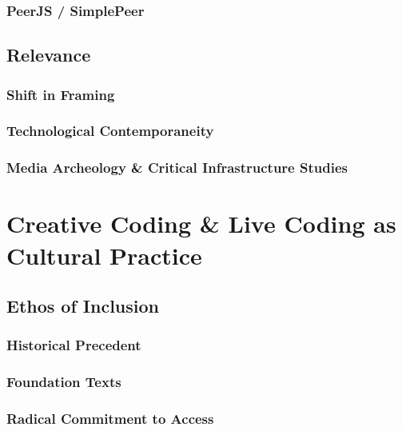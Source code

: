 \documentclass[
  american,
  12pt,
]{article}
\begin{document}
\subsubsection{PeerJS / SimplePeer}\label{peerjs-simplepeer}

\subsection{Relevance}\label{relevance}

\subsubsection{Shift in Framing}\label{shift-in-framing}

\subsubsection{Technological
Contemporaneity}\label{technological-contemporaneity}

\subsubsection{Media Archeology \& Critical Infrastructure
Studies}\label{media-archeology-critical-infrastructure-studies}

\section{Creative Coding \& Live Coding as Cultural
Practice}\label{creative-coding-live-coding-as-cultural-practice}

\subsection{Ethos of Inclusion}\label{ethos-of-inclusion}

\subsubsection{Historical Precedent}\label{historical-precedent}

\subsubsection{Foundation Texts}\label{foundation-texts}

\subsubsection{Radical Commitment to
Access}\label{radical-commitment-to-access}
\end{document}
